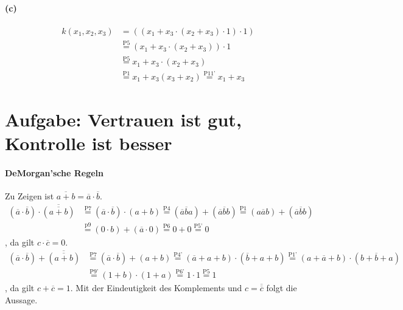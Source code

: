 \documentclass[a4paper]{article}
\begin{document}
\paragraph{(c)}
\begin{align*}
	k(x_1,x_2,x_3) &= ((x_1 + x_3\cdot (x_2+x_3)\cdot 1)\cdot 1) \\
				   &\stackrel{\text{P5}}{=} (x_1+x_3\cdot(x_2+x_3))\cdot 1\\
				   &\stackrel{\text{P5}}{=} x_1 + x_3\cdot(x_2+x_3)\\
				   &\stackrel{\text{P1}}{=} x_1+x_3(x_3+x_2) \stackrel{\text{P11'}}{=} x_1+x_3
\end{align*}


\section{Aufgabe: Vertrauen ist gut, Kontrolle ist besser}
\paragraph{DeMorgan'sche Regeln}
Zu Zeigen ist $\overline{a+b} = \overline{a}\cdot\overline{b}$.\\
\begin{align*}
	(\overline{a}\cdot\overline{b})\cdot\overline{(\overline{a+b})}& \stackrel{\text{P7}}{=} (\overline{a}\cdot\overline{b})\cdot(a+b) \stackrel{\text{P4}}{=} (\overline{a}\overline{b}a)+(\overline{a}\overline{b}b) \stackrel{\text{P1}}{=} (a\overline{a}b)+(\overline{a}\overline{b}b)\\
																   &\stackrel{\text{p9}}{=} (0\cdot b)+(\overline{a}\cdot 0) \stackrel{\text{P6}}{=} 0+0 \stackrel{\text{P5'}}{=} 0
\end{align*}
, da gilt $c\cdot\overline{c}=0$.\\
\begin{align*}
	(\overline{a}\cdot\overline{b})+\overline{(\overline{a+b})}& \stackrel{\text{P7}}{=} (\overline{a}\cdot\overline{b})+(a+b) \stackrel{\text{P4'}}{=} (\overline{a}+a+b)\cdot(\overline{b}+a+b) \stackrel{\text{P1'}}{=} (a+\overline{a}+b)\cdot(b+\overline{b}+a)\\
															   &\stackrel{\text{P9'}}{=}(1+b)\cdot(1+a)\stackrel{\text{P6'}}{=} 1\cdot 1 \stackrel{\text{P5}}{=} 1
\end{align*}
, da gilt $c+\overline{c}=1$. Mit der Eindeutigkeit des Komplements und $c=\overline{\overline{c}}$ folgt die Aussage.\\
\end{document}
